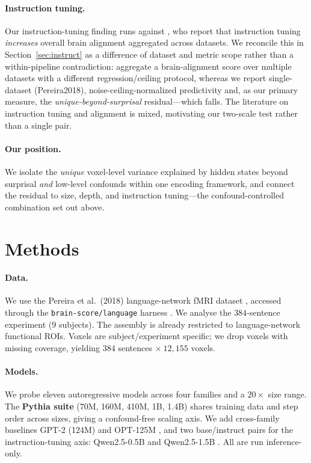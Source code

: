 \documentclass{article}
\begin{document}
\paragraph{Instruction tuning.} Our instruction-tuning finding runs against
\citet{aw2024}, who report that instruction tuning \emph{increases} overall brain alignment
aggregated across datasets. We reconcile this in Section~\ref{sec:instruct} as a difference of
dataset and metric scope rather than a within-pipeline contradiction: \citet{aw2024} aggregate
a brain-alignment score over multiple datasets with a different regression/ceiling protocol,
whereas we report single-dataset (Pereira2018), noise-ceiling-normalized predictivity and, as
our primary measure, the \emph{unique-beyond-surprisal} residual---which falls. The literature
on instruction tuning and alignment is mixed, motivating our two-scale test rather than a single
pair.

\paragraph{Our position.} We isolate the \emph{unique} voxel-level variance explained by hidden
states beyond surprisal \emph{and} low-level confounds within one encoding framework, and
connect the residual to size, depth, and instruction tuning---the confound-controlled
combination set out above.

\section{Methods}
\label{sec:methods}

\paragraph{Data.} We use the Pereira et al.\ (2018) language-network fMRI dataset
\citep{pereira2018}, accessed through the \texttt{brain-score/language} harness
\citep{schrimpf2021}. We analyse the $384$-sentence experiment ($9$ subjects). The assembly is
already restricted to language-network functional ROIs. Voxels are subject/experiment specific;
we drop voxels with missing coverage, yielding $384$ sentences $\times\ 12{,}155$ voxels.

\paragraph{Models.} We probe eleven autoregressive models across four families and a
$20\times$ size range. The \textbf{Pythia suite} (70M, 160M, 410M, 1B, 1.4B)
\citep{biderman2023pythia} shares training data and step order across sizes, giving a
confound-free scaling axis. We add cross-family baselines GPT-2 (124M) \citep{radford2019} and
OPT-125M \citep{zhang2022opt}, and two base/instruct pairs for the instruction-tuning axis:
Qwen2.5-0.5B and Qwen2.5-1.5B \citep{qwen2025}. All are run inference-only.
\end{document}
